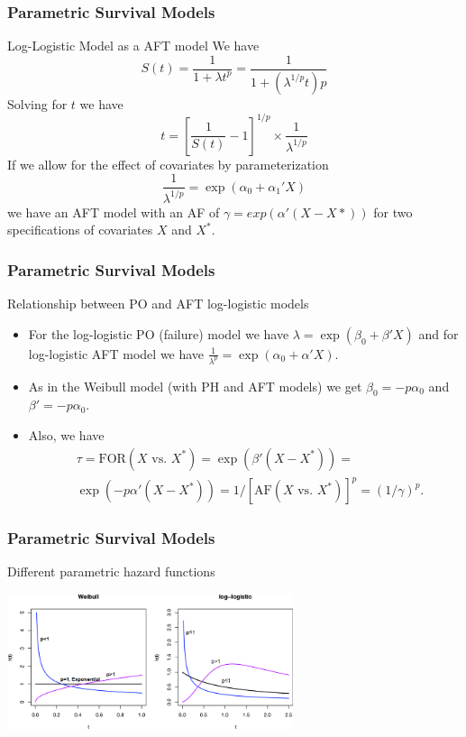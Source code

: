 \documentclass{beamer}
\theoremstyle{definition}
\begin{document}
\begin{frame}
\frametitle{Parametric Survival Models}
\begin{block}{Log-Logistic Model as a AFT model}
We have
\[
S(t) = \frac{1}{1 + \lambda t^p} = \frac{1}{1 + \left(\lambda^{1/p}t\right)p}
\]
Solving for $t$ we have
\[
t = \left[\frac{1}{S(t)} - 1 \right]^{1/p} \times \frac{1}{\lambda^{1/p}}
\]
If we allow for the effect of covariates by parameterization
\[
\frac{1}{\lambda^{1/p}} = \exp(\alpha_0 + \alpha_1' X)
\]
we have an AFT model with an AF of $\gamma=exp(\alpha'(X-X*))$ for two specifications of covariates $X$ and $X^*$.
\end{block}
\end{frame}

\begin{frame}
\frametitle{Parametric Survival Models}
\begin{block}{Relationship between PO and AFT log-logistic models}
\begin{itemize}
\item For the log-logistic PO (failure) model we have $\lambda = \exp(\beta_0 + \beta'X)$ and for log-logistic AFT model we have $\frac{1}{\lambda^p} = \exp(\alpha_0 + \alpha'X)$.
\item As in the Weibull model (with PH and AFT models) we get  $\beta_0 = -p \alpha_0$ and $\beta' = -p \alpha_0$.
\item Also, we have
\begin{align*}
& \tau = \text{FOR}(X \text{ vs. } X^*) = \exp(\beta'(X - X^*)) =\\
&\exp(-p\alpha'(X - X^*)) = 1/[\text{AF}(X \text{ vs. } X^*)]^p = (1/\gamma)^p.
\end{align*}
\end{itemize}
\end{block}
\end{frame}


\begin{frame}
\frametitle{Parametric Survival Models}
\begin{block}{Different parametric hazard functions}
\begin{center}
\includegraphics[width =\textwidth, height=4cm]{hazards.png}
\end{center}
 \end{block}
\end{frame}
\end{document}
